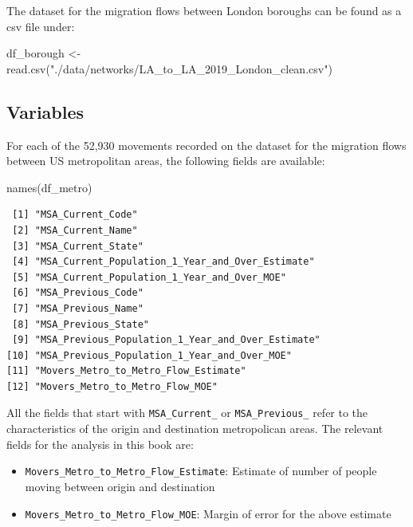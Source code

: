 \documentclass[
  letterpaper,
  DIV=11,
  numbers=noendperiod]{scrreprt}
\newenvironment{Shaded}{\begin{snugshade}}{\end{snugshade}}
\newcommand{\FunctionTok}[1]{\textcolor[rgb]{0.28,0.35,0.67}{#1}}
\newcommand{\NormalTok}[1]{\textcolor[rgb]{0.00,0.23,0.31}{#1}}
\newcommand{\OtherTok}[1]{\textcolor[rgb]{0.00,0.23,0.31}{#1}}
\newcommand{\StringTok}[1]{\textcolor[rgb]{0.13,0.47,0.30}{#1}}
\providecommand{\tightlist}{%
  \setlength{\itemsep}{0pt}\setlength{\parskip}{0pt}}\usepackage{longtable,booktabs,array}
\begin{document}
The dataset for the migration flows between London boroughs can be found
as a csv file under:

\begin{Shaded}
\begin{Highlighting}[]
\NormalTok{df\_borough }\OtherTok{\textless{}{-}} \FunctionTok{read.csv}\NormalTok{(}\StringTok{"./data/networks/LA\_to\_LA\_2019\_London\_clean.csv"}\NormalTok{)}
\end{Highlighting}
\end{Shaded}

\hypertarget{variables-2}{%
\subsection*{Variables}\label{variables-2}}

For each of the 52,930 movements recorded on the dataset for the
migration flows between US metropolitan areas, the following fields are
available:

\begin{Shaded}
\begin{Highlighting}[]
\FunctionTok{names}\NormalTok{(df\_metro)}
\end{Highlighting}
\end{Shaded}

\begin{verbatim}
 [1] "MSA_Current_Code"                                
 [2] "MSA_Current_Name"                                
 [3] "MSA_Current_State"                               
 [4] "MSA_Current_Population_1_Year_and_Over_Estimate" 
 [5] "MSA_Current_Population_1_Year_and_Over_MOE"      
 [6] "MSA_Previous_Code"                               
 [7] "MSA_Previous_Name"                               
 [8] "MSA_Previous_State"                              
 [9] "MSA_Previous_Population_1_Year_and_Over_Estimate"
[10] "MSA_Previous_Population_1_Year_and_Over_MOE"     
[11] "Movers_Metro_to_Metro_Flow_Estimate"             
[12] "Movers_Metro_to_Metro_Flow_MOE"                  
\end{verbatim}

All the fields that start with \texttt{MSA\_Current\_} or
\texttt{MSA\_Previous\_} refer to the characteristics of the origin and
destination metropolican areas. The relevant fields for the analysis in
this book are:

\begin{itemize}
\tightlist
\item
  \texttt{Movers\_Metro\_to\_Metro\_Flow\_Estimate}: Estimate of number
  of people moving between origin and destination
\item
  \texttt{Movers\_Metro\_to\_Metro\_Flow\_MOE}: Margin of error for the
  above estimate
\end{itemize}
\end{document}
